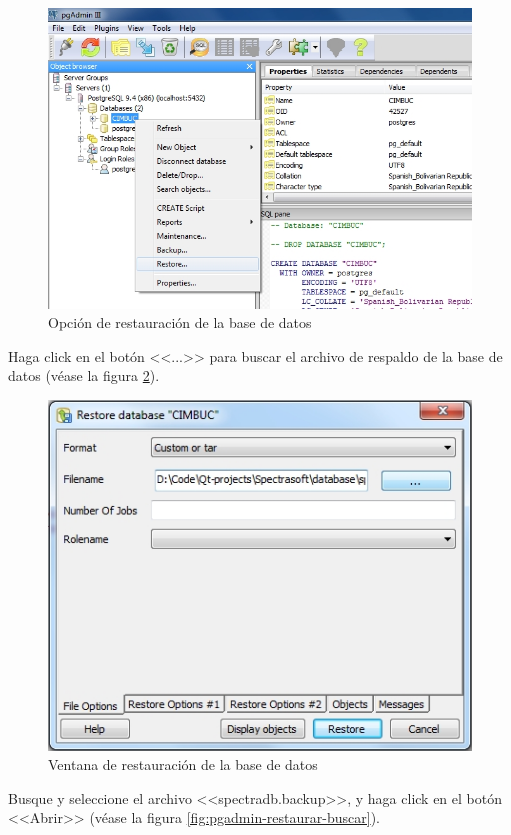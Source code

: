 \begin{figure}[H]
  \centering
  \includegraphics[width=1\linewidth]{./img/pgadmin-restaurar.jpg}
\caption[]{Opci\'{o}n de restauraci\'{o}n de la base de datos\label{fig:pgadmin-restaurar}}
\end{figure}

\newpage

Haga click en el bot\'{o}n <<...>> para buscar el archivo de respaldo de la base de datos (v\'{e}ase la figura \ref{fig:pgadmin-restaurar-ventana}).

\begin{figure}[H]
  \centering
  \includegraphics[width=.6\linewidth]{./img/pgadmin-restaurar-ventana.jpg}
\caption[]{Ventana de restauraci\'{o}n de la base de datos\label{fig:pgadmin-restaurar-ventana}}
\end{figure}

Busque y seleccione el archivo <<spectradb.backup>>, y haga click en el bot\'{o}n <<Abrir>> (v\'{e}ase la figura \ref{fig:pgadmin-restaurar-buscar}).

